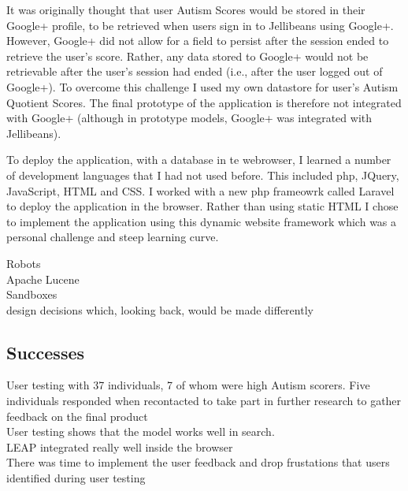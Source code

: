\documentclass[a4paper, 11pt]{article}
\begin{document}
\vspace{5mm}
It was originally thought that user Autism Scores would be stored in their Google+ profile, to be retrieved when users sign in to Jellibeans using Google+. However, Google+ did not allow for a field to persist after the session ended to retrieve the user's score. Rather, any data stored to Google+ would not be retrievable after the user's session had ended (i.e., after the user logged out of Google+). To overcome this challenge I used my own datastore for user's Autism Quotient Scores. The final prototype of the application is therefore not integrated with Google+ (although in prototype models, Google+ was integrated with Jellibeans).

\vspace{5mm}
To deploy the application, with a database in te webrowser, I learned a number of development languages that I had not used before. This included php, JQuery, JavaScript, HTML and CSS. I worked with a new php frameowrk called Laravel to deploy the application in the browser. Rather than using static HTML I chose to implement the application using this dynamic website framework which was a personal challenge and steep learning curve. 

\vspace{5mm}
Robots\\
Apache Lucene\\
Sandboxes\\

\vspace{5mm}
design decisions which, looking back, would be made differently

\subsection{Successes}
User testing with 37 individuals, 7 of whom were high Autism scorers. Five individuals responded when recontacted to take part in further research to gather feedback on the final product\\
User testing shows that the model works well in search.\\
LEAP integrated really well inside the browser\\
There was time to implement the user feedback and drop frustations that users identified during user testing\\
\end{document}
